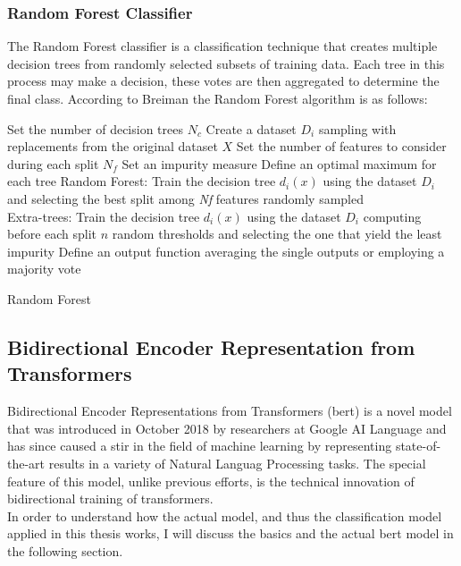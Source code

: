 \documentclass[a4paper, 11pt,titlepage,oneside,openany]{book}
\begin{document}
\subsubsection{Random Forest Classifier}
The Random Forest classifier is a classification technique that creates multiple decision trees from randomly selected subsets of training data. Each tree in this process may make a decision, these votes are then aggregated to determine the final class. According to Breiman \cite{randomforest} the Random Forest algorithm is as follows:\\

\begin{algorithm}[H]
	\DontPrintSemicolon
	Set the number of decision trees $N_c$\;
		{Create a dataset $D_i$ sampling with replacements from the original dataset $X$}
	Set the number of features  to consider during each split $N_f$\;
	Set an impurity measure\;
	Define an optimal maximum for each tree\;
		{Random Forest: Train the decision tree $d_i(x)$ using the dataset $D_i$ and selecting the best split among \textit{Nf} features randomly sampled \\
		Extra-trees:  Train the decision tree $d_i(x)$ using the dataset $D_i$ computing before each split $n$ random thresholds and selecting the one that yield the least impurity}
	Define an output function averaging the single outputs or employing a majority vote
	\caption{Random Forest}
\end{algorithm}

\newpage
\subsection{Bidirectional Encoder Representation from Transformers}
Bidirectional Encoder Representations from Transformers (\gls{bert}) \cite{bert} is a novel model that was introduced in October 2018 by researchers at Google AI Language and has since caused a stir in the field of machine learning by representing state-of-the-art results in a variety of Natural Languag Processing tasks. The special feature of this model, unlike previous efforts, is the technical innovation of bidirectional training of transformers. \\
\noindent In order to understand how the actual model, and thus the classification model applied in this thesis works, I will discuss the basics and the actual \gls{bert} model in the following section.
\end{document}
